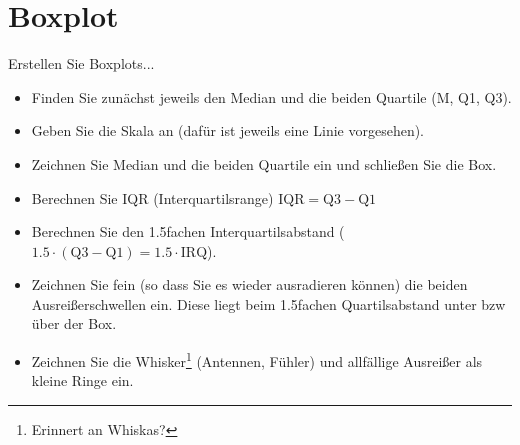 


\renewcommand{\metaHeaderLine}{Arbeitsblatt}
\renewcommand{\arbeitsblattTitel}{Boxplot}


\usepackage{cancel}

\newcommand\Ccancel[2][black]{\renewcommand\CancelColor{\color{#1}}\cancel{#2}}


\arbeitsblattHeader{}
\section{Boxplot}
Erstellen Sie Boxplots...


\begin{itemize}
\item Finden Sie zunächst jeweils den Median und die beiden Quartile
(M, Q1, Q3).
\item Geben Sie die Skala an (dafür ist jeweils eine Linie
vorgesehen).
\item Zeichnen Sie Median und die beiden Quartile ein und schließen
Sie die Box.
\item Berechnen Sie IQR (Interquartilsrange) $\textrm{IQR} = \textrm{Q3} - \textrm{Q1}$
\item Berechnen Sie den 1.5fachen Interquartilsabstand
($1.5\cdot{}(\textrm{Q3}-\textrm{Q1}) = 1.5 \cdot \textrm{IRQ}$).
\item Zeichnen Sie fein (so dass Sie es wieder ausradieren können) die beiden
Ausreißerschwellen ein. Diese liegt beim 1.5fachen Quartilsabstand
unter bzw über der Box.
\item Zeichnen Sie die Whisker\footnote{Erinnert an Whiskas?}
(Antennen, Fühler) und  allfällige Ausreißer als kleine Ringe ein.
\end{itemize}

\newcommand{\boxplot}[2]{
\subsection{Daten}
\begin{tabular}{#1}
\hline
#2\\
\hline
\end{tabular}

\subsubsection*{Boxplot}
\noTRAINER{\mmPapier{1.6}}
}%


